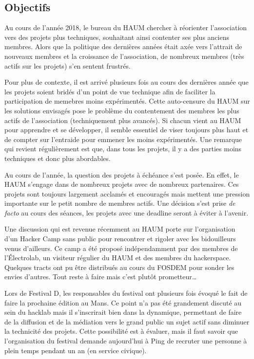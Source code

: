 \documentclass[11pt]{article}
\begin{document}
\subsection{Objectifs}

Au cours de l'année 2018, le bureau du HAUM chercher à réorienter l'association vers des
projets plus techniques, souhaitant ainsi contenter ses plus anciens membres. Alors que la
politique des dernières années était axée vers l'attrait de nouveaux membres et la
croissance de l'association, de nombreux membres (très actifs sur les projets) s'en
sentent frustrés.

Pour plus de contexte, il est arrivé plusieurs fois au cours des dernières année que les
projets soient bridés d'un point de vue technique afin de faciliter la participation de
memebres moins expérimentés. Cette auto-censure du HAUM sur les solutions envisagés pose
le problème du contentement des membres les plus actifs de l'association (techniquement
plus avancés). Si chacun vient au HAUM pour apprendre et se développer, il semble
essentiel de viser toujours plus haut et de compter sur l'entraide pour emmener les moins
expérimentés. Une remarque qui revient régulièrement est que, dans tous les projets, il y
a des parties moins techniques et donc plus abordables.

Au cours de l'année, la question des projets à échéance s'est posée. En effet, le HAUM
s'engage dans de nombreux projets avec de nombreux partenaires. Ces projets sont toujours
largement acclamés et encouragés mais mettent une pression importante sur le petit nombre
de membres actifs. Une décision s'est prise \textit{de facto} au cours des séances, les
projets avec une deadline seront à éviter à l'avenir.

Une discussion qui est revenue récemment au HAUM porte sur l'organisation d'un Hacker Camp
sans public pour rencontrer et rigoler avec les bidouilleurs venus d'ailleurs. Ce camp a
été proposé indépendamment par des membres de l'Électrolab, un visiteur régulier du HAUM
et des membres du hackerspace. Quelques tracts ont pu être distribués au cours du FOSDEM
pour sonder les envies d'autres. Tout reste à faire mais c'est plutôt prometteur\ldots

Lors de Festival D, les responsables du festival ont plusieurs fois évoqué le fait de
faire la prochaine édition au Mans. Ce point n'a pas été grandement discuté au sein du
hacklab mais il s'inscrirait bien dans la dynamique, permettant de faire de la diffusion
et de la médiation vers le grand public un sujet actif sans diminuer la technicité des
projets. Cette possibilité est à évaluer, mais il faut savoir que l'organisation du
festival demande aujourd'hui à Ping de recruter une personne à plein temps pendant un an
(en service civique).
\end{document}
